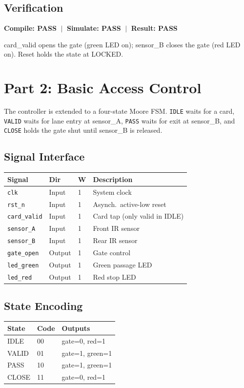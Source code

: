 \documentclass[12pt,a4paper]{ctexart}
\begin{document}
\subsection*{Verification}
{\color{passgreen}\textbf{Compile: PASS} $\;|\;$
 \textbf{Simulate: PASS} $\;|\;$
 \textbf{Result: PASS}}

card\_valid opens the gate (green LED on); sensor\_B closes the gate
(red LED on). Reset holds the state at LOCKED.

\newpage

\section{Part 2: Basic Access Control}

The controller is extended to a four-state Moore FSM. \texttt{IDLE}
waits for a card, \texttt{VALID} waits for lane entry at sensor\_A,
\texttt{PASS} waits for exit at sensor\_B, and \texttt{CLOSE} holds
the gate shut until sensor\_B is released.

\subsection*{Signal Interface}
\begin{tabular}{llll}
\toprule
\textbf{Signal} & \textbf{Dir} & \textbf{W} & \textbf{Description} \\
\midrule
\texttt{clk}       & Input  & 1 & System clock \\
\texttt{rst\_n}    & Input  & 1 & Asynch.\ active-low reset \\
\texttt{card\_valid} & Input  & 1 & Card tap (only valid in IDLE) \\
\texttt{sensor\_A} & Input  & 1 & Front IR sensor \\
\texttt{sensor\_B} & Input  & 1 & Rear IR sensor \\
\texttt{gate\_open} & Output & 1 & Gate control \\
\texttt{led\_green} & Output & 1 & Green passage LED \\
\texttt{led\_red}   & Output & 1 & Red stop LED \\
\bottomrule
\end{tabular}

\subsection*{State Encoding}
\begin{tabular}{lll}
\toprule
\textbf{State} & \textbf{Code} & \textbf{Outputs} \\
\midrule
IDLE  & 00 & gate=0, red=1 \\
VALID & 01 & gate=1, green=1 \\
PASS  & 10 & gate=1, green=1 \\
CLOSE & 11 & gate=0, red=1 \\
\bottomrule
\end{tabular}
\end{document}
